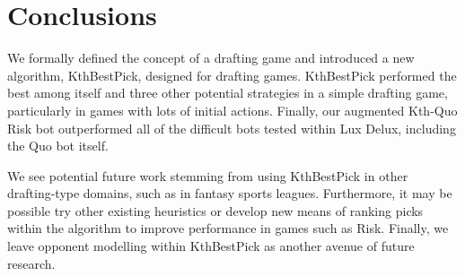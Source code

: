 \documentclass[letterpaper]{article}
\numberwithin{equation}{section}
\numberwithin{theorem}{section}
\numberwithin{lemma}{section}
\numberwithin{df}{section}
\begin{document}
\section{Conclusions}



We formally defined the concept of a drafting game and introduced a new algorithm, KthBestPick, designed for drafting games.  KthBestPick performed the best among itself and three other potential strategies in a simple drafting game, particularly in games with lots of initial actions.  Finally, our augmented Kth-Quo Risk bot outperformed all of the difficult bots tested within Lux Delux, including the Quo bot itself.


We see potential future work stemming from using KthBestPick in other drafting-type domains, such as in fantasy sports leagues.  Furthermore, it may be possible try other existing heuristics or develop new means of ranking picks within the algorithm to improve performance in games such as Risk.  Finally, we leave opponent modelling within KthBestPick as another avenue of future research.
\end{document}
